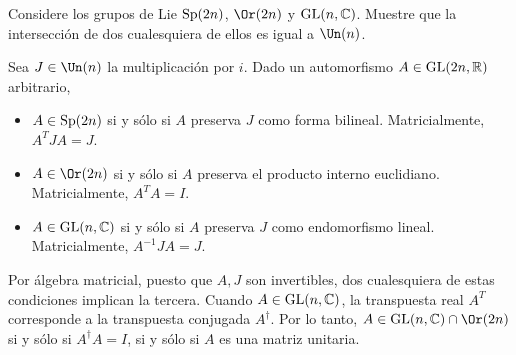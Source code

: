 \begin{problem}
Considere los grupos de Lie $\operatorname{Sp}(2n)$, $\Or(2n)$ y $\operatorname{GL}(n, \mathbb C)$. Muestre que la intersección de dos cualesquiera de ellos es igual a $\Un(n)$.
\end{problem}

\begin{solution}
Sea $J \in \Un(n)$ la multiplicación por $i$. Dado un automorfismo $A \in \operatorname{GL}(2n, \mathbb R)$ arbitrario,
\begin{itemize}
    \item $A \in \operatorname{Sp}(2n)$ si y sólo si $A$ preserva $J$ como forma bilineal. Matricialmente, $A^T J A = J$.
    \item $A \in \Or(2n)$ si y sólo si $A$ preserva el producto interno euclidiano. Matricialmente, $A^T A = I$.
    \item $A \in \operatorname{GL}(n, \mathbb C)$ si y sólo si $A$ preserva $J$ como endomorfismo lineal. Matricialmente, $A^{-1} J A = J$.
\end{itemize}

Por álgebra matricial, puesto que $A, J$ son invertibles, dos cualesquiera de estas condiciones implican la tercera. Cuando $A \in \operatorname{GL}(n, \mathbb C)$, la transpuesta real $A^T$ corresponde a la transpuesta conjugada $A^\dagger$. Por lo tanto, $A \in \GL(n, \mathbb C) \cap \Or(2n)$ si y sólo si $A^\dagger A = I$, si y sólo si $A$ es una matriz unitaria.
\end{solution}
